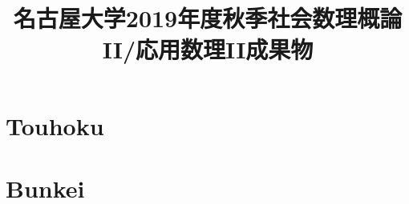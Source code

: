 \documentclass{jsarticle}
\title{名古屋大学2019年度秋季社会数理概論II/応用数理II成果物}
\author{}
\date{}
\numberwithin{equation}{answer}
\begin{document}
\maketitle


\section{Touhoku}



\section{Bunkei}





\end{document}
